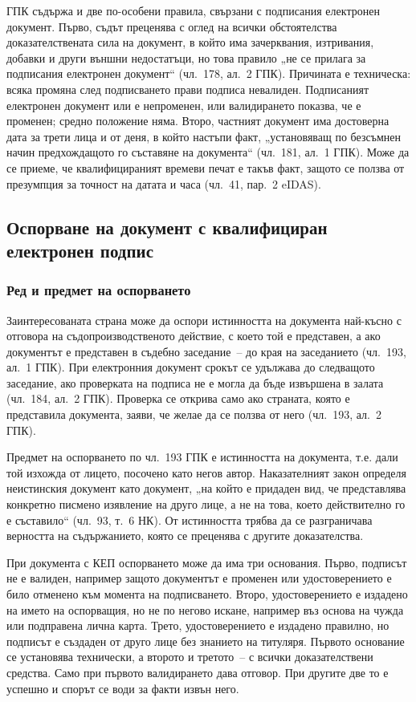ГПК съдържа и две по-особени правила, свързани с подписания електронен документ. Първо,
съдът преценява с оглед на всички обстоятелства доказателствената сила на документ, в който
има зачерквания, изтривания, добавки и други външни недостатъци, но това правило „не се
прилага за подписания електронен документ“ (чл.~178, ал.~2 ГПК). Причината е техническа:
всяка промяна след подписването прави подписа невалиден. Подписаният електронен документ
или е непроменен, или валидирането показва, че е променен; средно положение няма. Второ,
частният документ има достоверна дата за трети лица и от деня, в който настъпи факт,
„установяващ по безсъмнен начин предхождащото го съставяне на документа“ (чл.~181, ал.~1
ГПК). Може да се приеме, че квалифицираният времеви печат е такъв факт, защото се ползва
от презумпция за точност на датата и часа (чл.~41, пар.~2 eIDAS).

\subsection{Оспорване на документ с квалифициран електронен подпис}
\label{sec:osporvane}

\subsubsection{Ред и предмет на оспорването}
\label{sec:red}

Заинтересованата страна може да оспори истинността на документа най-късно с отговора на
съдопроизводственото действие, с което той е представен, а ако документът е представен в
съдебно заседание~-- до края на заседанието (чл.~193, ал.~1 ГПК). При електронния документ
срокът се удължава до следващото заседание, ако проверката на подписа не е могла да бъде
извършена в залата (чл.~184, ал.~2 ГПК). Проверка се открива само ако страната, която е
представила документа, заяви, че желае да се ползва от него (чл.~193, ал.~2 ГПК).

Предмет на оспорването по чл.~193 ГПК е истинността на документа, т.е. дали той изхожда от
лицето, посочено като негов автор. Наказателният закон определя неистинския документ като
документ, „на който е придаден вид, че представлява конкретно писмено изявление на друго
лице, а не на това, което действително го е съставило“ (чл.~93, т.~6 НК). От истинността
трябва да се разграничава верността на съдържанието, която се преценява с другите
доказателства.

При документа с КЕП оспорването може да има три основания. Първо, подписът не е валиден,
например защото документът е променен или удостоверението е било отменено към момента на
подписването. Второ, удостоверението е издадено на името на оспорващия, но не по негово
искане, например въз основа на чужда или подправена лична карта. Трето, удостоверението е
издадено правилно, но подписът е създаден от друго лице без знанието на титуляря. Първото
основание се установява технически, а второто и третото~-- с всички доказателствени
средства. Само при първото валидирането дава отговор. При другите две то е успешно и
спорът се води за факти извън него.

